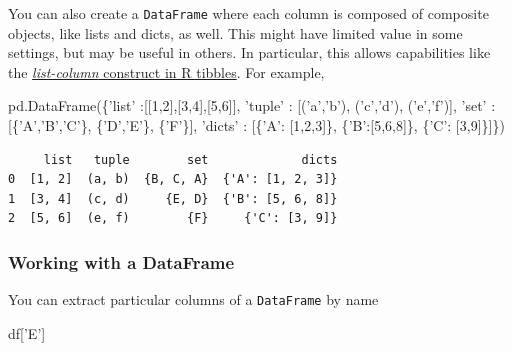 \documentclass[
  letterpaper,
]{scrbook}
\newenvironment{Shaded}{\begin{snugshade}}{\end{snugshade}}
\newcommand{\DecValTok}[1]{\textcolor[rgb]{0.00,0.00,0.81}{#1}}
\newcommand{\NormalTok}[1]{#1}
\newcommand{\StringTok}[1]{\textcolor[rgb]{0.31,0.60,0.02}{#1}}
\begin{document}
You can also create a \texttt{DataFrame} where each column is composed of composite objects, like lists and dicts, as well. This might have limited value in some settings, but may be useful in others. In particular, this allows capabilities like the \href{https://jennybc.github.io/purrr-tutorial/ls13_list-columns.html}{\emph{list-column} construct in R tibbles}. For example,

\begin{Shaded}
\begin{Highlighting}[]
\NormalTok{pd.DataFrame(\{}\StringTok{'list'}\NormalTok{ :[[}\DecValTok{1}\NormalTok{,}\DecValTok{2}\NormalTok{],[}\DecValTok{3}\NormalTok{,}\DecValTok{4}\NormalTok{],[}\DecValTok{5}\NormalTok{,}\DecValTok{6}\NormalTok{]],}
             \StringTok{'tuple'}\NormalTok{ : [(}\StringTok{'a'}\NormalTok{,}\StringTok{'b'}\NormalTok{), (}\StringTok{'c'}\NormalTok{,}\StringTok{'d'}\NormalTok{), (}\StringTok{'e'}\NormalTok{,}\StringTok{'f'}\NormalTok{)],}
              \StringTok{'set'}\NormalTok{ : [\{}\StringTok{'A'}\NormalTok{,}\StringTok{'B'}\NormalTok{,}\StringTok{'C'}\NormalTok{\}, \{}\StringTok{'D'}\NormalTok{,}\StringTok{'E'}\NormalTok{\}, \{}\StringTok{'F'}\NormalTok{\}], }
            \StringTok{'dicts'}\NormalTok{ : [\{}\StringTok{'A'}\NormalTok{: [}\DecValTok{1}\NormalTok{,}\DecValTok{2}\NormalTok{,}\DecValTok{3}\NormalTok{]\}, \{}\StringTok{'B'}\NormalTok{:[}\DecValTok{5}\NormalTok{,}\DecValTok{6}\NormalTok{,}\DecValTok{8}\NormalTok{]\}, \{}\StringTok{'C'}\NormalTok{: [}\DecValTok{3}\NormalTok{,}\DecValTok{9}\NormalTok{]\}]\})}
\end{Highlighting}
\end{Shaded}

\begin{verbatim}
     list   tuple        set             dicts
0  [1, 2]  (a, b)  {B, C, A}  {'A': [1, 2, 3]}
1  [3, 4]  (c, d)     {E, D}  {'B': [5, 6, 8]}
2  [5, 6]  (e, f)        {F}     {'C': [3, 9]}
\end{verbatim}

\hypertarget{working-with-a-dataframe}{%
\subsubsection{Working with a DataFrame}\label{working-with-a-dataframe}}

You can extract particular columns of a \texttt{DataFrame} by name

\begin{Shaded}
\begin{Highlighting}[]
\NormalTok{df[}\StringTok{'E'}\NormalTok{]}
\end{Highlighting}
\end{Shaded}
\end{document}
